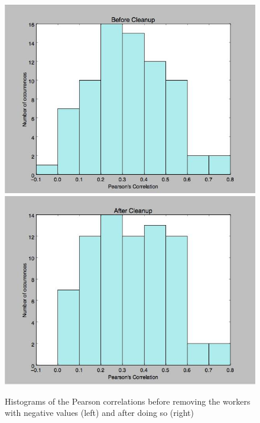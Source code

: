 \documentclass[dvips,12pt]{article}
\begin{document}
\begin{figure}[h]
\includegraphics[scale=0.36]{hist_bad}
\includegraphics[scale=0.36]{hist_good}
\caption{Histograms of the Pearson correlations before removing the workers with negative values (left) and after doing so (right)}
\end{figure}
\end{document}
